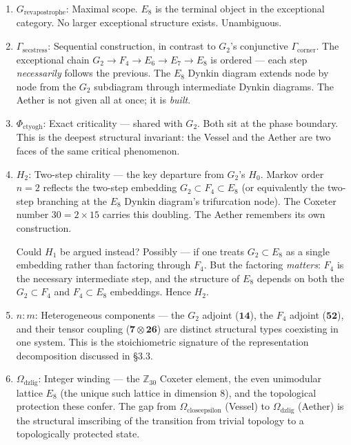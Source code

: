 \documentclass[12pt,a4paper]{article}
\newcommand{\pilcrow}{\S}
\begin{document}
\begin{enumerate}
    \item \textbf{$G_{\text{revapostrophe}}$}: Maximal scope. $E_8$ is the terminal object in the exceptional category. No larger exceptional structure exists. Unambiguous.
    \item \textbf{$\Gamma_{\text{secstress}}$}: Sequential construction, in contrast to $G_2$'s conjunctive $\Gamma_{\text{corner}}$. The exceptional chain $G_2 \to F_4 \to E_6 \to E_7 \to E_8$ is ordered --- each step \emph{necessarily} follows the previous. The $E_8$ Dynkin diagram extends node by node from the $G_2$ subdiagram through intermediate Dynkin diagrams. The Aether is not given all at once; it is \emph{built}.
    \item \textbf{$\Phi_{\text{ctyogh}}$}: Exact criticality --- shared with $G_2$. Both sit at the phase boundary. This is the deepest structural invariant: the Vessel and the Aether are two faces of the same critical phenomenon.
    \item 
    \textbf{$H_2$}: Two-step chirality --- the key departure from $G_2$'s $H_0$. Markov order $n=2$ reflects the two-step embedding $G_2 \subset F_4 \subset E_8$ (or equivalently the two-step branching at the $E_8$ Dynkin diagram's trifurcation node). The Coxeter number $30 = 2 \times 15$ carries this doubling. The Aether remembers its own construction.

    Could $H_1$ be argued instead? Possibly --- if one treats $G_2 \subset E_8$ as a single embedding rather than factoring through $F_4$. But the factoring \emph{matters}: $F_4$ is the necessary intermediate step, and the structure of $E_8$ depends on both the $G_2 \subset F_4$ and $F_4 \subset E_8$ embeddings. Hence $H_2$.

    \item \textbf{$n{:}m$}: Heterogeneous components --- the $G_2$ adjoint ($\mathbf{14}$), the $F_4$ adjoint ($\mathbf{52}$), and their tensor coupling ($\mathbf{7} \otimes \mathbf{26}$) are distinct structural types coexisting in one system. This is the stoichiometric signature of the representation decomposition discussed in \pilcrow{}3.3.
    \item \textbf{$\Omega_{\text{dzlig}}$}: Integer winding --- the $\mathbb{Z}_{30}$ Coxeter element, the even unimodular lattice $E_8$ (the unique such lattice in dimension 8), and the topological protection these confer. The gap from $\Omega_{\text{closeepsilon}}$ (Vessel) to $\Omega_{\text{dzlig}}$ (Aether) is the structural imscribing of the transition from trivial topology to a topologically protected state.
\end{enumerate}
\end{document}
